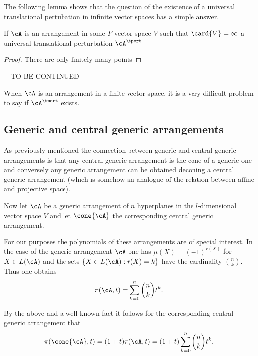 The following lemma shows that the question of the existence of a universal translational pertubation in infinite vector spaces has a simple answer.

\begin{lemma}
    If $\cA$ is an arrangement in some $F$-vector space $V$ such that $\card{V}=\infty$ a universal translational perturbation $\cA^{\tpert}$
\end{lemma}

\begin{proof}
    There are only finitely many points 
\end{proof}

---TO BE CONTINUED


When $\cA$ is an arrangement in a finite vector space, it is a very difficult problem to say if $\cA^{\tpert}$ exists.

\subsection{Generic and central generic arrangements}

As previously mentioned the connection between generic and central generic arrangements is that any central generic arrangement is the cone of a generic one and conversely any generic arrangement can be obtained deconing a central generic arrangement (which is somehow an analogue of the relation between affine and projective space).

Now let $\cA$ be a generic arrangement of $n$ hyperplanes in the $l$-dimensional vector space $V$ and let $\cone{\cA}$ the corresponding central generic arrangement.

For our purposes the  polynomials of these arrangements are of special interest.
In the case of the generic arrangement $\cA$ one has $\mu(X)=(-1)^{r(X)}$ for $X\in L(\cA)$ and the sets $\{X\in L(\cA):r(X)=k\}$ have the cardinality $\binom{n}{k}$. Thus one obtains
$$
  \pi(\cA,t)=\sum_{k=0}^n{\binom{n}{k}t^k}\text{.}
$$

By the above and a well-known fact it follows for the corresponding central generic arrangement that
$$
  \pi(\cone{\cA},t)=(1+t)\pi(\cA,t)=(1+t)\sum_{k=0}^n{\binom{n}{k}t^k}\text{.}
$$



